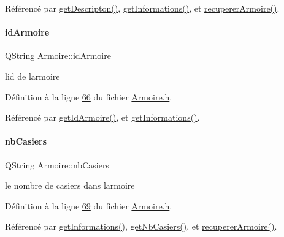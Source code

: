 Référencé par \hyperlink{_armoire_8cpp_source_l00116}{get\+Descripton()}, \hyperlink{_armoire_8cpp_source_l00078}{get\+Informations()}, et \hyperlink{_armoire_8cpp_source_l00049}{recuperer\+Armoire()}.

\mbox{\label{class_armoire_a131caceb7d4b90cb7761851757e80f57}} 
\paragraph{\texorpdfstring{id\+Armoire}{idArmoire}}
{\footnotesize\ttfamily Q\+String Armoire\+::id\+Armoire\hspace{0.3cm}{\ttfamily [private]}}



l\textquotesingle{}id de l\textquotesingle{}armoire 



Définition à la ligne \hyperlink{_armoire_8h_source_l00066}{66} du fichier \hyperlink{_armoire_8h_source}{Armoire.\+h}.



Référencé par \hyperlink{_armoire_8cpp_source_l00094}{get\+Id\+Armoire()}, et \hyperlink{_armoire_8cpp_source_l00078}{get\+Informations()}.

\mbox{\label{class_armoire_a9c4e926b7cddb13d097b75b3f5ef3de8}} 
\paragraph{\texorpdfstring{nb\+Casiers}{nbCasiers}}
{\footnotesize\ttfamily Q\+String Armoire\+::nb\+Casiers\hspace{0.3cm}{\ttfamily [private]}}



le nombre de casiers dans l\textquotesingle{}armoire 



Définition à la ligne \hyperlink{_armoire_8h_source_l00069}{69} du fichier \hyperlink{_armoire_8h_source}{Armoire.\+h}.



Référencé par \hyperlink{_armoire_8cpp_source_l00078}{get\+Informations()}, \hyperlink{_armoire_8cpp_source_l00127}{get\+Nb\+Casiers()}, et \hyperlink{_armoire_8cpp_source_l00049}{recuperer\+Armoire()}.

